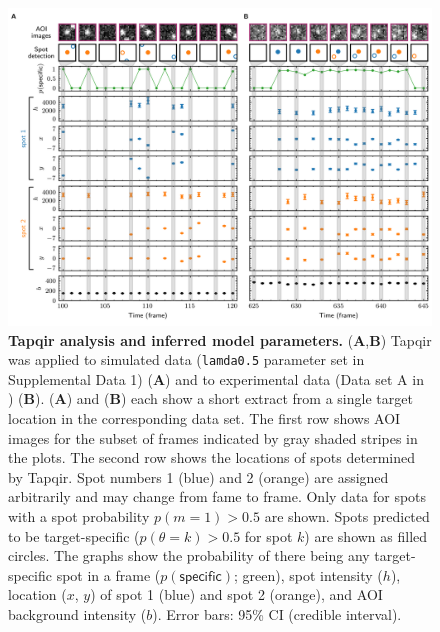 \begin{figure}
\begin{fullwidth}
\includegraphics[width=183mm]{figures/tapqir_analysis.png}
\caption{\textbf{Tapqir analysis and inferred model parameters.} (\textbf{A},\textbf{B}) Tapqir was applied to simulated data (\texttt{lamda0.5} parameter set in Supplemental Data 1) (\textbf{A}) and to experimental data (Data set A in ) (\textbf{B}). (\textbf{A}) and (\textbf{B}) each show a short extract from a single target location in the corresponding data set. The first row shows AOI images for the subset of frames indicated by gray shaded stripes in the plots. The second row shows the locations of spots determined by Tapqir. Spot numbers 1 (blue) and 2 (orange) are assigned arbitrarily and may change from fame to frame. Only data for spots with a spot probability $p(m=1) > 0.5$ are shown. Spots predicted to be target-specific ($p(\theta=k)>0.5$ for spot $k$) are shown as filled circles. The graphs show the probability of there being any target-specific spot in a frame ($p(\mathsf{specific})$; green), spot intensity ($h$), location ($x$, $y$) of spot 1 (blue) and spot 2 (orange), and AOI background intensity ($b$). Error bars: 95\% CI (credible interval).}
\label{fig:tapqir_analysis}


\end{fullwidth}
\end{figure}
